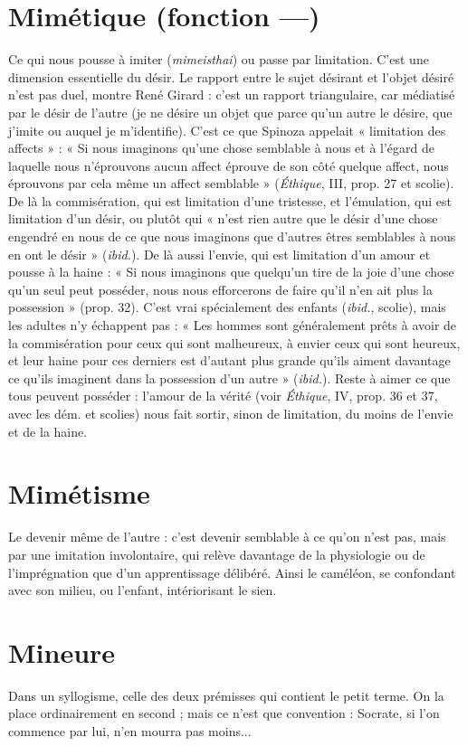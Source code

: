 \section{Mimétique (fonction —)}
Ce qui nous pousse à imiter ({\it mimeisthai})
ou passe par limitation. C’est une dimension
essentielle du désir. Le rapport entre le sujet désirant et l’objet désiré n’est
pas duel, montre René Girard : c’est un rapport triangulaire, car médiatisé par
le désir de l’autre (je ne désire un objet que parce qu’un autre le désire, que
j'imite ou auquel je m'identifie). C’est ce que Spinoza appelait « limitation des
affects » : « Si nous imaginons qu’une chose semblable à nous et à l'égard de
laquelle nous n’éprouvons aucun affect éprouve de son côté quelque affect,
nous éprouvons par cela même un affect semblable » ({\it Éthique}, III, prop. 27 et
scolie). De là la commisération, qui est limitation d’une tristesse, et l’émulation,
qui est limitation d’un désir, ou plutôt qui « n’est rien autre que le désir
d’une chose engendré en nous de ce que nous imaginons que d’autres êtres
semblables à nous en ont le désir » ({\it ibid.}). De là aussi l'envie, qui est limitation
d’un amour et pousse à la haine : « Si nous imaginons que quelqu'un tire de la
joie d’une chose qu’un seul peut posséder, nous nous efforcerons de faire qu’il
n’en ait plus la possession » (prop. 32). C’est vrai spécialement des enfants
({\it ibid.}, scolie), mais les adultes n’y échappent pas : « Les hommes sont généralement
prêts à avoir de la commisération pour ceux qui sont malheureux, à
envier ceux qui sont heureux, et leur haine pour ces derniers est d’autant plus
grande qu’ils aiment davantage ce qu’ils imaginent dans la possession d’un
autre » ({\it ibid.}). Reste à aimer ce que tous peuvent posséder : l'amour de la vérité
(voir {\it Éthique}, IV, prop. 36 et 37, avec les dém. et scolies) nous fait sortir, sinon
de limitation, du moins de l’envie et de la haine.

\section{Mimétisme}
Le devenir même de l’autre : c’est devenir semblable à ce
qu’on n’est pas, mais par une imitation involontaire, qui
relève davantage de la physiologie ou de l’imprégnation que d’un apprentissage
délibéré. Ainsi le caméléon, se confondant avec son milieu, ou l’enfant, intériorisant
le sien.

\section{Mineure}
Dans un syllogisme, celle des deux prémisses qui contient le
petit terme. On la place ordinairement en second ; mais ce n’est
que convention : Socrate, si l’on commence par lui, n’en mourra pas moins...

